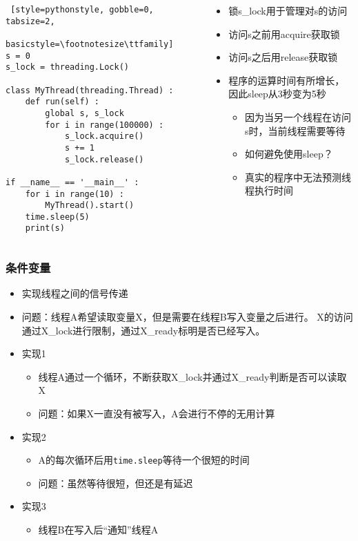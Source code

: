 \begin{CJK}{UTF8}{gbsn}
\begin{frame}[fragile]
\begin{columns}[T]
\begin{column}[T]{.5\textwidth}
\begin{lstlisting} [style=pythonstyle, gobble=0, tabsize=2, 
								basicstyle=\footnotesize\ttfamily]
s = 0
s_lock = threading.Lock()

class MyThread(threading.Thread) :
	def run(self) :
		global s, s_lock
		for i in range(100000) :
			s_lock.acquire()
			s += 1
			s_lock.release()

if __name__ == '__main__' :
	for i in range(10) :
		MyThread().start()
	time.sleep(5)
	print(s)
			\end{lstlisting}
		\end{column}
		\begin{column}[T]{.5\textwidth}
			\begin{itemize}
			\item 锁s\_lock用于管理对s的访问
			\item 访问s之前用acquire获取锁
			\item 访问s之后用release获取锁
			\item 程序的运算时间有所增长，因此sleep从3秒变为5秒
				\begin{itemize}
				\item 因为当另一个线程在访问s时，当前线程需要等待
				\item 如何避免使用sleep？
				\item 真实的程序中无法预测线程执行时间
				\end{itemize}
			\end{itemize}
		\end{column}
	\end{columns}
\end{frame}

\begin{frame}
	\frametitle{条件变量}
	\begin{itemize}
	\item 实现线程之间的信号传递
	\item 问题：线程A希望读取变量X，但是需要在线程B写入变量之后进行。
			X的访问通过X\_lock进行限制，通过X\_ready标明是否已经写入。
	\item 实现1
		\begin{itemize}
		\item 线程A通过一个循环，不断获取X\_lock并通过X\_ready判断是否可以读取X
		\item 问题：如果X一直没有被写入，A会进行不停的无用计算
		\end{itemize}
	\item 实现2
		\begin{itemize}
		\item A的每次循环后用\texttt{time.sleep}等待一个很短的时间
		\item 问题：虽然等待很短，但还是有延迟
		\end{itemize}
	\item 实现3
		\begin{itemize}
		\item 线程B在写入后``通知''线程A
		\end{itemize}
	\end{itemize}
\end{frame}


\end{CJK}
